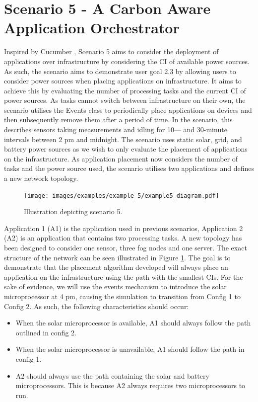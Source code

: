 \documentclass{l4proj}
\begin{document}
\section{Scenario 5 - A Carbon Aware Application Orchestrator}\label{eval:subsec:scenario 5}
Inspired by Cucumber \citep{cucumber}, Scenario 5 aims to consider the deployment of applications over infrastructure by considering the CI of available power sources.
As such, the scenario aims to demonstrate user goal 2.3 by allowing users to consider power sources when placing applications on infrastructure.
It aims to achieve this by evaluating the number of processing tasks and the current CI of power sources.
As tasks cannot switch between infrastructure on their own, the scenario utilises the Events class to periodically place applications on devices and then subsequently remove them after a period of time.
In the scenario, this describes sensors taking measurements and idling for 10— and 30-minute intervals between 2 pm and midnight.
The scenario uses static solar, grid, and battery power sources as we wish to only evaluate the placement of applications on the infrastructure.
As application placement now considers the number of tasks and the power source used, the scenario utilises two applications and defines a new network topology.

\begin{figure}[h]
    \centering
    \texttt{[image: images/examples/example\_5/example5\_diagram.pdf]}
    ~
    \caption{Illustration depicting scenario 5.}
    \label{fig:example5_diagram}
\end{figure}

Application 1 (A1) is the application used in previous scenarios, Application 2 (A2) is an application that contains two processing tasks.
A new topology has been designed to consider one sensor, three fog nodes and one server.
The exact structure of the network can be seen illustrated in Figure \ref{fig:example5_diagram}.
The goal is to demonstrate that the placement algorithm developed will always place an application on the infrastructure using the path with the smallest CIs.
For the sake of evidence, we will use the events mechanism to introduce the solar microprocessor at 4 pm, causing the simulation to transition from Config 1 to Config 2.
As such, the following characteristics should occur:
\begin{itemize}
    \item When the solar microprocessor is available, A1 should always follow the path outlined in config 2.
    \item When the solar microprocessor is unavailable, A1 should follow the path in config 1.
    \item A2 should always use the path containing the solar and battery microprocessors. This is because A2 always requires two microprocessors to run.
\end{itemize}
\end{document}
